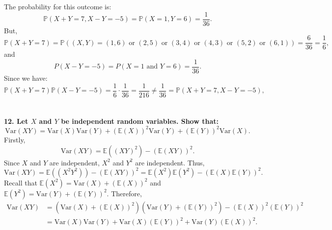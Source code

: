 \documentclass[a4paper,11pt]{article}
\begin{document}
The probability for this outcome is:
\[
\mathbb{P}(X + Y = 7, X - Y = -5) = \mathbb{P}(X = 1, Y = 6) = \frac{1}{36}.
\]
But,
\[
\mathbb{P}(X + Y = 7) = \mathbb{P}((X, Y) = (1, 6) \text{ or } (2, 5) \text{ or } (3, 4) \text{ or } (4, 3) \text{ or } (5, 2) \text{ or } (6, 1)) = \frac{6}{36} = \frac{1}{6},
\]
and
\[
P(X - Y = -5) = P(X = 1 \text{ and } Y = 6) = \frac{1}{36}.
\]
Since we have:
\[
\mathbb{P}(X + Y = 7) \mathbb{P}(X - Y = -5) = \frac{1}{6} \cdot \frac{1}{36} = \frac{1}{216} \neq \frac{1}{36} = \mathbb{P}(X + Y = 7, X - Y = -5),
\]
\\ \\
\textbf{12. Let \(X\) and \(Y\) be independent random variables. Show that:}
\[
\text{Var}(XY) = \text{Var}(X)\text{Var}(Y) + (\mathbb{E}(X))^2\text{Var}(Y) + (\mathbb{E}(Y))^2\text{Var}(X).
\]
Firstly,
\[
\text{Var}(XY) = \mathbb{E}((XY)^2) - (\mathbb{E}(XY))^2.
\]
Since $X$ and $Y$ are independent, $X^2$ and $Y^2$ are independent. Thus,
\[
\text{Var}(XY) = \mathbb{E}((X^2Y^2)) - (\mathbb{E}(XY))^2 = \mathbb{E}(X^2)\mathbb{E}(Y^2) - (\mathbb{E}(X)\mathbb{E}(Y))^2.
\]
Recall that \(\mathbb{E}(X^2) = \text{Var}(X) + (\mathbb{E}(X))^2\) and \(\mathbb{E}(Y^2) = \text{Var}(Y) + (\mathbb{E}(Y))^2\). Therefore,
\begin{align*}
    \text{Var}(XY) &= (\text{Var}(X) + (\mathbb{E}(X))^2)(\text{Var}(Y) + (\mathbb{E}(Y))^2) - (\mathbb{E}(X))^2 (\mathbb{E}(Y))^2\\
    &= \text{Var}(X)\text{Var}(Y) + \text{Var}(X)(\mathbb{E}(Y))^2 + \text{Var}(Y)(\mathbb{E}(X))^2.
\end{align*}
\end{document}
